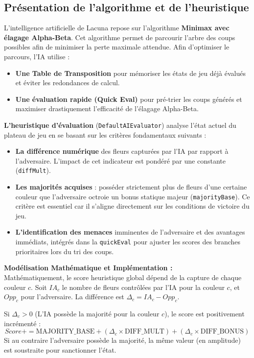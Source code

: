 \documentclass[12pt, a4paper]{article}
\begin{document}
\subsection{Présentation de l'algorithme et de l'heuristique}
L'intelligence artificielle de Lacuna repose sur l'algorithme \textbf{Minimax avec élagage Alpha-Beta}. Cet algorithme permet de parcourir l'arbre des coups possibles afin de minimiser la perte maximale attendue. 
Afin d'optimiser le parcours, l'IA utilise :
\begin{itemize}
    \item \textbf{Une Table de Transposition} pour mémoriser les états de jeu déjà évalués et éviter les redondances de calcul.
    \item \textbf{Une évaluation rapide (Quick Eval)} pour pré-trier les coups générés et maximiser drastiquement l'efficacité de l'élagage Alpha-Beta.
\end{itemize}

\textbf{L'heuristique d'évaluation} (\texttt{DefaultAIEvaluator}) analyse l'état actuel du plateau de jeu en se basant sur les critères fondamentaux suivants :
\begin{itemize}
    \item \textbf{La différence numérique} des fleurs capturées par l'IA par rapport à l'adversaire. L'impact de cet indicateur est pondéré par une constante (\texttt{diffMult}).
    \item \textbf{Les majorités acquises} : posséder strictement plus de fleurs d'une certaine couleur que l'adversaire octroie un bonus statique majeur (\texttt{majorityBase}). Ce critère est essentiel car il s'aligne directement sur les conditions de victoire du jeu.
    \item \textbf{L'identification des menaces} imminentes de l'adversaire et des avantages immédiats, intégrés dans la \texttt{quickEval} pour ajuster les scores des branches prioritaires lors du tri des coups.
\end{itemize}

\textbf{Modélisation Mathématique et Implémentation :}\\
Mathématiquement, le score heuristique global dépend de la capture de chaque couleur $c$. Soit $IA_c$ le nombre de fleurs contrôlées par l'IA pour la couleur $c$, et $Opp_c$ pour l'adversaire. La différence est $\Delta_c = IA_c - Opp_c$.

Si $\Delta_c > 0$ (L'IA possède la majorité pour la couleur $c$), le score est positivement incrémenté :
\begin{equation}
Score += \text{MAJORITY\_BASE} + (\Delta_c \times \text{DIFF\_MULT}) + (\Delta_c \times \text{DIFF\_BONUS})
\end{equation}
Si au contraire l'adversaire possède la majorité, la même valeur (en amplitude) est soustraite pour sanctionner l'état.
\end{document}
